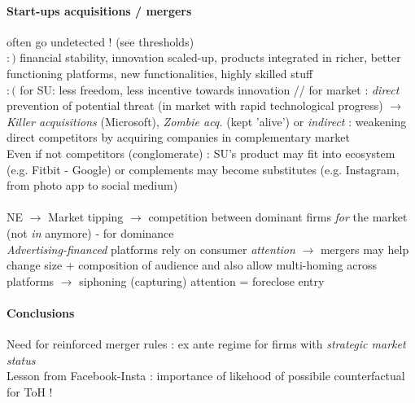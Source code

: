 \documentclass[10pt]{article}
\begin{document}
\paragraph{Start-ups acquisitions / mergers} often go undetected ! (see thresholds) 
\\$\boxed{:)}$ financial stability, innovation scaled-up, products integrated in richer, better functioning platforms, new functionalities, highly skilled stuff
\\$\boxed{:(}$ for SU: less freedom, less incentive towards innovation // for market : \textit{direct} prevention of potential threat (in market with rapid technological progress) $\rightarrow$ \textit{Killer acquisitions} (Microsoft), \textit{Zombie acq.} (kept 'alive') or \textit{indirect} : weakening direct competitors by acquiring companies in complementary market
\\Even if not competitors (conglomerate) : SU's product may fit into ecosystem (e.g. Fitbit - Google) or complements may become substitutes (e.g. Instagram, from photo app to social medium)
\\~\\NE $\rightarrow$ Market tipping $\rightarrow$ competition between dominant firms \textit{for} the market (not \textit{in} anymore) - for dominance
\\\textit{Advertising-financed} platforms rely on consumer \textit{attention} $\rightarrow$ mergers may help change size + composition of audience and also allow multi-homing across platforms $\rightarrow$ siphoning (capturing) attention = foreclose entry

\paragraph{Conclusions} Need for reinforced merger rules : ex ante regime for firms with \textit{strategic market status}
\\Lesson from Facebook-Insta : importance of likehood of possibile counterfactual for ToH !
\end{document}
